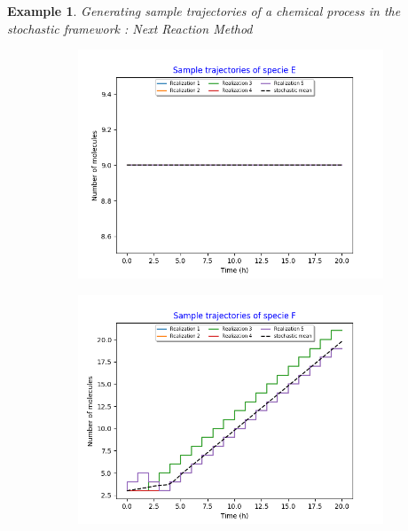 \documentclass[11pt,a4paper]{article}
\newtheorem{example}[theorem]{Example}
\begin{document}
\begin{example}{Generating sample trajectories of a chemical process in the stochastic framework : Next Reaction Method}
\begin{figure}[H]
\begin{subfigure}{.5\textwidth}
        \includegraphics[width=1.1\linewidth]{Images/e.png}
        \label{fig: Single sample trajectory}
    \end{subfigure}%
    \begin{subfigure}{.5\textwidth}
      \centering
        \includegraphics[width=1.1\linewidth]{Images/f.png}
        \label{fig: Single sample trajectory}
    \end{subfigure}
    \centering
    \begin{subfigure}{.5\textwidth}
      \centering

\end{subfigure}
\end{figure}
\end{example}
\end{document}
